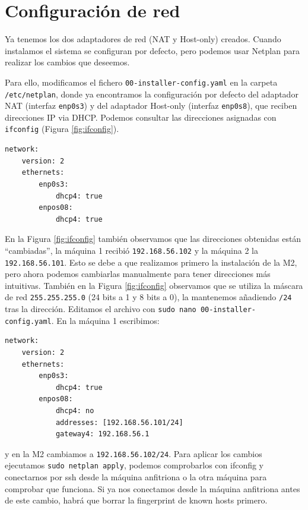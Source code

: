 \documentclass{article}
\begin{document}
\section{Configuración de red}

Ya tenemos los dos adaptadores de red (NAT y Host-only) creados. Cuando instalamos el sistema se configuran por defecto,
pero podemos usar Netplan para realizar los cambios que deseemos.

Para ello, modificamos el fichero \texttt{00-installer-config.yaml} en la carpeta \texttt{/etc/netplan}, donde ya encontramos
 la configuración por defecto del adaptador NAT (interfaz \texttt{enp0s3}) y del adaptador Host-only (interfaz \texttt{enp0s8}),
 que reciben direcciones IP via DHCP. Podemos consultar las direcciones asignadas con \texttt{ifconfig} (Figura \ref{fig:ifconfig}).

\begin{Verbatim}[tabsize=4]
network:
	version: 2
	ethernets:
		enp0s3:
			dhcp4: true
		enpos08:
			dhcp4: true
\end{Verbatim}

En la Figura \ref{fig:ifconfig} también observamos que las direcciones obtenidas están ``cambiadas'', la máquina 1 recibió
 \texttt{192.168.56.102} y la máquina 2 la \texttt{192.168.56.101}. Esto se debe a que realizamos primero la instalación de la M2,
 pero ahora podemos cambiarlas manualmente para tener direcciones más intuitivas. También en la Figura \ref{fig:ifconfig} observamos
 que se utiliza la máscara de red \texttt{255.255.255.0} (24 bits a 1 y 8 bits a 0), la mantenemos añadiendo \texttt{/24} tras la dirección.
  Editamos el archivo con 
 \texttt{sudo nano 00-installer-config.yaml}. En la máquina 1 escribimos:

\begin{Verbatim}[tabsize=4]
network:
	version: 2
	ethernets:
		enp0s3:
			dhcp4: true
		enpos08:
			dhcp4: no
			addresses: [192.168.56.101/24]
			gateway4: 192.168.56.1
\end{Verbatim}

y en la M2 cambiamos a \texttt{192.168.56.102/24}. Para aplicar los cambios ejecutamos \texttt{sudo netplan apply}, podemos comprobarlos
con ifconfig y conectarnos por ssh desde la máquina anfitriona o la otra máquina para comprobar que funciona. Si ya nos conectamos
desde la máquina anfitriona antes de este cambio, habrá que borrar la fingerprint de known hosts primero.
\end{document}
